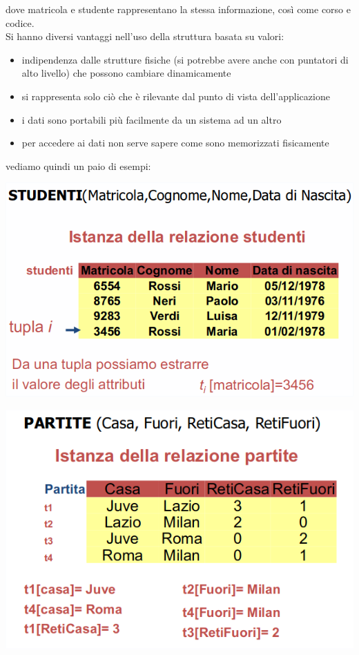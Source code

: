 \documentclass[a4paper,12pt, oneside]{book}
\begin{document}
dove matricola e studente rappresentano la stessa informazione, così come corso e codice.\\
Si hanno diversi vantaggi nell'uso della struttura basata su valori:
\begin{itemize}
	\item indipendenza dalle strutture fisiche (si potrebbe avere anche con puntatori di alto livello) che possono cambiare dinamicamente 
	\item si rappresenta solo ciò che è rilevante dal punto di vista dell'applicazione
	\item i dati sono portabili più facilmente da un sistema ad un altro
	\item per accedere ai dati non serve sapere come sono memorizzati fisicamente
\end{itemize}
vediamo quindi un paio di esempi:
\begin{center}
	\includegraphics[scale=0.7]{img/rel5.png}
\end{center}
\begin{center}
	\includegraphics[scale=0.7]{img/rel6.png}
\end{center}
\end{document}
